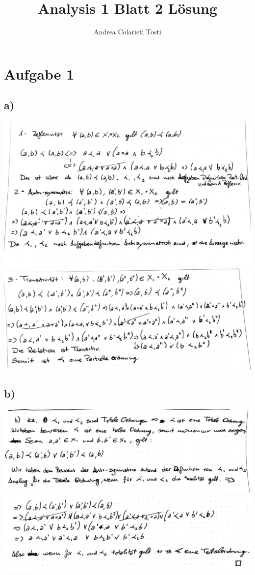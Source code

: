 \documentclass[14pt,a4paper,landscape]{article}
\author{Andrea Colarieti Tosti}
\title{Analysis 1 Blatt 2 Lösung}
\begin{document}
\maketitle \newpage
\section*{Aufgabe 1}
\subsection*{a)}
\includegraphics[scale=0.3]{AB2-1a_1.jpg} \newpage
\includegraphics[scale=0.3]{AB2-1a_2.jpg} 
\subsection*{b)}
\includegraphics[scale=0.3]{AB2-1b_1.jpg} \\
\includegraphics[scale=0.3]{AB2-1b_2.jpg} 
\end{document}
